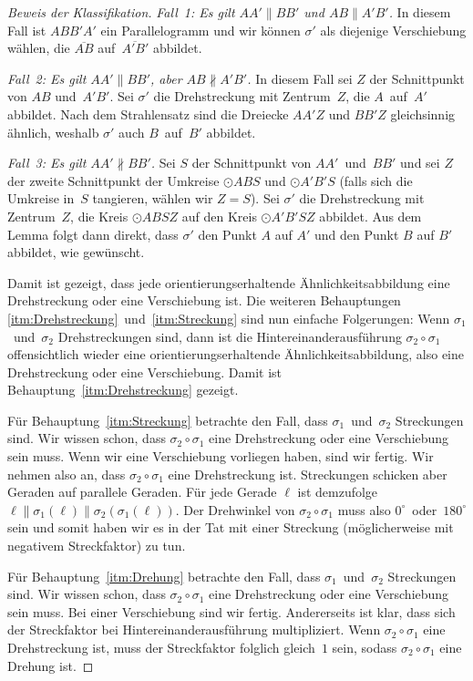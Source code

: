 \begin{proof}[Beweis der Klassifikation]
	\emph{Fall~1: Es gilt $AA'\parallel BB'$ und $AB\parallel A'B'$.}
	In diesem Fall ist $ABB'A'$ ein Parallelogramm und wir können $\sigma'$ als diejenige Verschiebung wählen, die $\overline{AB}$ auf~$\overline{A'B'}$ abbildet.
	
	\emph{Fall~2: Es gilt $AA'\parallel BB'$, aber $AB\nparallel A'B'$.}
	In diesem Fall sei $Z$ der Schnittpunkt von $AB$ und~$A'B'$. Sei $\sigma'$ die Drehstreckung mit Zentrum~$Z$, die $A$~auf~$A'$ abbildet. Nach dem Strahlensatz sind die Dreiecke $AA'Z$ und $BB'Z$ gleichsinnig ähnlich, weshalb $\sigma'$ auch $B$~auf~$B'$ abbildet.
	
	\emph{Fall~3: Es gilt $AA'\nparallel BB'$.}
	Sei $S$ der Schnittpunkt von $AA'$~und~$BB'$ und sei $Z$ der zweite Schnittpunkt der Umkreise $\odot ABS$ und $\odot A'B'S$ (falls sich die Umkreise in~$S$ tangieren, wählen wir $Z=S$). Sei $\sigma'$ die Drehstreckung mit Zentrum~$Z$, die Kreis $\odot ABSZ$ auf den Kreis $\odot A'B'SZ$ abbildet. Aus dem Lemma folgt dann direkt, dass $\sigma'$ den Punkt $A$ auf $A'$ und den Punkt $B$ auf $B'$ abbildet, wie gewünscht.
	
	Damit ist gezeigt, dass jede orientierungserhaltende Ähnlichkeitsabbildung eine Drehstreckung oder eine Verschiebung ist. Die weiteren Behauptungen \ref{itm:Drehstreckung}~und~\ref{itm:Streckung} sind nun einfache Folgerungen: Wenn $\sigma_1$~und~$\sigma_2$ Drehstreckungen sind, dann ist die Hintereinanderausführung $\sigma_2\circ \sigma_1$ offensichtlich wieder eine orientierungserhaltende Ähnlichkeitsabbildung, also eine Drehstreckung oder eine Verschiebung. Damit ist Behauptung~\ref{itm:Drehstreckung} gezeigt.
	
	Für Behauptung~\ref{itm:Streckung} betrachte den Fall, dass $\sigma_1$~und~$\sigma_2$ Streckungen sind. Wir wissen schon, dass $\sigma_2\circ \sigma_1$ eine Drehstreckung oder eine Verschiebung sein muss. Wenn wir eine Verschiebung vorliegen haben, sind wir fertig. Wir nehmen also an, dass $\sigma_2\circ \sigma_1$ eine Drehstreckung ist. Streckungen schicken aber Geraden auf parallele Geraden. Für jede Gerade $\ell$ ist demzufolge  $\ell\parallel\sigma_1(\ell)\parallel \sigma_2(\sigma_1(\ell))$. Der Drehwinkel von $\sigma_2\circ \sigma_1$ muss also $0^\circ$~oder~$180^\circ$ sein und somit haben wir es in der Tat mit einer Streckung (möglicherweise mit negativem Streckfaktor) zu tun.
	
	Für Behauptung~\ref{itm:Drehung} betrachte den Fall, dass $\sigma_1$~und~$\sigma_2$ Streckungen sind. Wir wissen schon, dass $\sigma_2\circ \sigma_1$ eine Drehstreckung oder eine Verschiebung sein muss. Bei einer Verschiebung sind wir fertig. Andererseits ist klar, dass sich der Streckfaktor bei Hintereinanderausführung multipliziert. Wenn $\sigma_2\circ \sigma_1$ eine Drehstreckung ist, muss der Streckfaktor folglich gleich~$1$ sein, sodass $\sigma_2\circ\sigma_1$ eine Drehung ist.
\end{proof}
